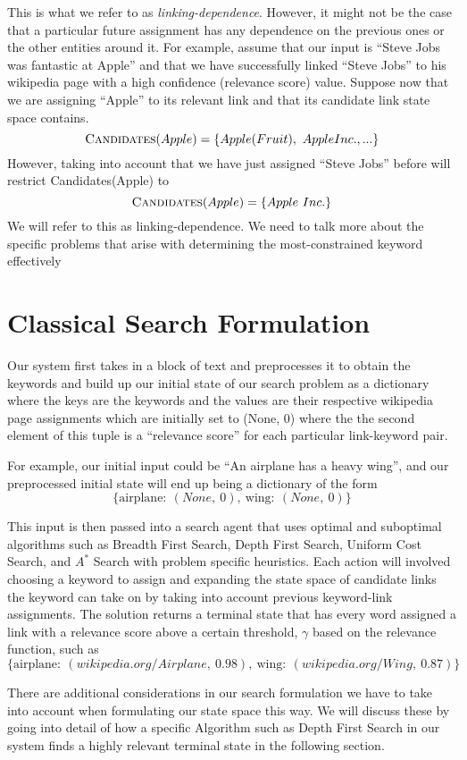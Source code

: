 \documentclass[twoside,11pt]{article}
\begin{document}
This is what we refer to as \textit{linking-dependence}. However, it might not be the case that a particular future assignment has any dependence on the previous ones or the other entities around it. For example, assume that our input is ``Steve Jobs was fantastic at Apple'' and that we have successfully linked ``Steve Jobs'' to his wikipedia page with a high confidence (relevance score) value. Suppose now that we are assigning ``Apple'' to its relevant link and that its candidate link state space contains.
$$\mbox{{\sc Candidates}}(Apple) = \{Apple (Fruit), \ Apple Inc., ...\}$$
However, taking into account that we have just assigned ``Steve Jobs'' before will restrict {\sc Candidates}(Apple) to
$$\mbox{{\sc Candidates}}(Apple) = \{Apple \ Inc.\}$$
We will refer to this as linking-dependence. We need to talk more about the specific problems that arise with determining the most-constrained keyword effectively

\section{Classical Search Formulation}
Our system first takes in a block of text and preprocesses it to obtain the keywords and build up our initial state of our search problem as a dictionary where the keys are the keywords and the values are their respective wikipedia page assignments which are initially set to (None, 0) where the the second element of this tuple is a ``relevance score'' for each particular link-keyword pair.

For example, our initial input could be ``An airplane has a heavy wing'', and our preprocessed initial state will end up being a dictionary of the form $$\{\mbox{airplane}: \ (None, \ 0), \  \mbox{wing}: \ (None, \ 0)\}$$

This input is then passed into a search agent that uses optimal and suboptimal algorithms such as Breadth First Search, Depth First Search, Uniform Cost Search, and $A^*$ Search with problem specific heuristics. Each action will involved choosing a keyword to assign and expanding the state space of candidate links the keyword can take on by taking into account previous keyword-link assignments. The solution returns a terminal state that has every word assigned a link with a relevance score above a certain threshold, $\gamma$ based on the relevance function, such as
$$\{\mbox{airplane}: \ (wikipedia.org/Airplane, \ 0.98), \  \mbox{wing}: \ (wikipedia.org/Wing, \ 0.87)\}$$

There are additional considerations in our search formulation we have to take into account when formulating our state space this way. We will discuss these by going into detail of how a specific Algorithm such as Depth First Search in our system finds a highly relevant terminal state in the following section.
\end{document}
